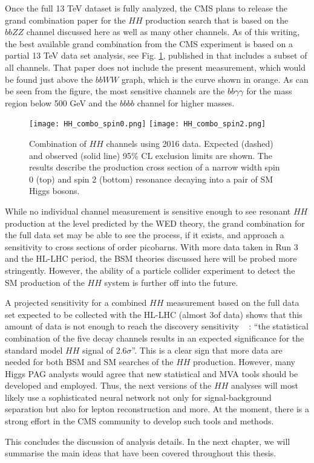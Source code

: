 Once the full 13 TeV dataset is fully analyzed, the CMS plans to release the grand combination paper for the $HH$ production search that is based on the $bbZZ$ channel discussed here as well as many other channels. As of this writing, the best available grand combination from the CMS experiment is based on a partial 13 TeV data set analysis, see Fig. \ref{HH_combo}, published in \cite{HH_combo} that includes a subset of all channels. That paper does not include the present measurement, which would be found just above the $bbWW$ graph, which is the curve shown in orange. As can be seen from the figure, the most sensitive channels are the $bb\gamma\gamma$ for the mass region below 500 GeV and the $bbbb$ channel for higher masses.

\begin{figure}[H]%
\begin{center}
\texttt{[image: HH\_combo\_spin0.png]}
\texttt{[image: HH\_combo\_spin2.png]}
\caption{ Combination of $HH$ channels using 2016 data. Expected (dashed) and observed (solid line) 95\% CL exclusion limits are shown. The results describe the production cross section of a narrow width spin 0 (top) and spin 2 (bottom) resonance decaying into a pair of SM Higgs bosons. }
\label{HH_combo}
\end{center}
\end{figure}

While no individual channel measurement is sensitive enough to see resonant $HH$ production at the level predicted by the WED theory, the grand combination for the full data set may be able to see the process, if it exists, and approach a sensitivity to cross sections of order picobarns. With more data taken in Run 3 and the HL-LHC period, the BSM theories discussed here will be probed more stringently. However, the ability of a particle collider experiment to detect the SM production of the $HH$ system is further off into the future.

A projected sensitivity for a combined $HH$ measurement based on the full data set expected to be collected with the HL-LHC (almost 3\abinv of data) shows that this amount of data is not enough to reach the discovery sensitivity ~\cite{CMS-PAS-FTR-18-019} : ``the statistical combination of the five decay channels results in an expected significance for the standard model $HH$ signal of 2.6$\sigma$''. This is a clear sign that more data are needed for both BSM and SM searches of the $HH$ production. However, many Higgs PAG analysts would agree that new statistical and MVA tools should be developed and employed. Thus, the next versions of the $HH$ analyses will most likely use a sophisticated neural network not only for signal-background separation but also for lepton reconstruction and more. At the moment, there is a strong effort in the CMS community to develop such tools and methods. 

This concludes the discussion of analysis details. In the next chapter, we will summarise the main ideas that have been covered throughout this thesis. 




